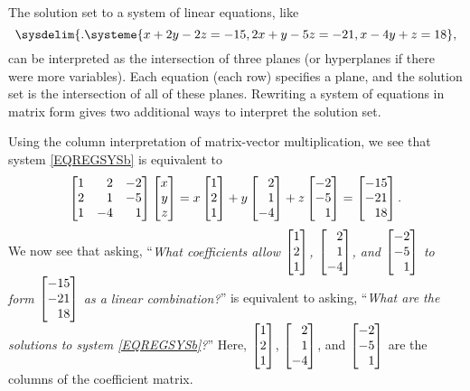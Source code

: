 
The solution set to a system of linear equations, like
\begin{equation}
	\label{EQREGSYSb}
	\sysdelim\{.
		\systeme{
			x+2y-2z=-15,
			2x+y-5z=-21,
			x-4y+z=18
		},
\end{equation}
can be interpreted as the intersection of three planes (or hyperplanes if there were more variables).
Each equation (each row) specifies a plane, and the solution set is the intersection of all of these planes.
Rewriting a system of equations in matrix form gives two additional ways to interpret  the solution set.


Using the column interpretation of matrix-vector multiplication, we see that system \eqref{EQREGSYSb} is equivalent to
\[
	\mat{1&2&-2\\2&1&-5\\1&-4&1}\mat{x\\y\\z}=
	     x\mat{1\\2\\1}+y\mat{2\\1\\-4}+z\mat{-2\\-5\\1}
	     =\mat{-15\\-21\\18}.
\]
We now see that asking, ``\emph{What coefficients
allow $\mat{1\\2\\1}$, $\mat{2\\1\\-4}$, and $\mat{-2\\-5\\1}$ to form $\mat{-15\\-21\\18}$ as a linear combination?}'' is
equivalent to asking, ``\emph{What are the solutions to system \eqref{EQREGSYSb}?}''
Here,
 $\mat{1\\2\\1}$, $\mat{2\\1\\-4}$, and $\mat{-2\\-5\\1}$ are the columns of the coefficient matrix.


